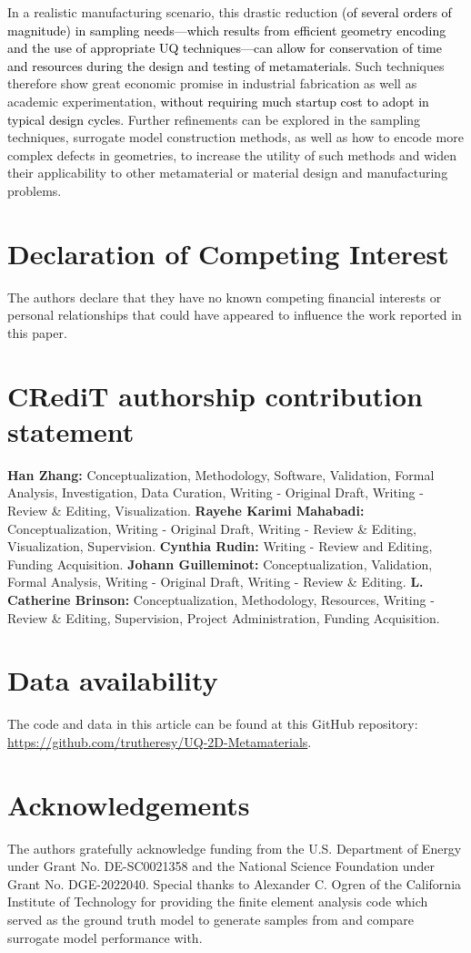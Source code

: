 \documentclass[preprint,review,12pt]{elsarticle}
\newcommand{\rev}[1]{\textcolor{black}{#1}}
\begin{document}
In a realistic manufacturing scenario, this drastic reduction \rev{(of several orders of magnitude) in sampling needs---which results from efficient geometry encoding and the use of appropriate UQ techniques---can allow for conservation of time and resources during the design and testing of metamaterials.} Such techniques therefore show great economic promise in industrial fabrication as well as academic experimentation, \rev{without requiring much startup cost to adopt in typical design cycles}. Further refinements can be explored in the sampling techniques, surrogate model construction methods, as well as how to encode more complex defects in geometries, to increase the utility of such methods and widen their applicability to other metamaterial or material design and manufacturing problems.

\section*{Declaration of Competing Interest}
The authors declare that they have no known competing financial interests or personal relationships that could have appeared to influence the work reported in this paper.

\section*{CRediT authorship contribution statement}
\textbf{Han Zhang:} Conceptualization, Methodology, Software, Validation, Formal Analysis, Investigation, Data Curation, Writing - Original Draft, Writing - Review \& Editing, Visualization. \textbf{Rayehe Karimi Mahabadi:} Conceptualization, Writing - Original Draft, Writing - Review \& Editing, Visualization, Supervision. \textbf{Cynthia Rudin:} Writing - Review and Editing, Funding Acquisition. \textbf{Johann Guilleminot:} Conceptualization, Validation, Formal Analysis, Writing - Original Draft, Writing - Review \& Editing. \textbf{L. Catherine Brinson:} Conceptualization, Methodology, Resources, Writing - Review \& Editing, Supervision, Project Administration, Funding Acquisition.

\section*{Data availability}
The code and data in this article
can be found at this GitHub repository:
\url{https://github.com/trutheresy/UQ-2D-Metamaterials}.

\section*{Acknowledgements}
The authors gratefully acknowledge funding from the U.S. Department of Energy under Grant No. DE-SC0021358 and the National Science Foundation under Grant No. DGE-2022040. Special thanks to Alexander C. Ogren of the California Institute of Technology for providing the finite element analysis code which served as the ground truth model to generate samples from and compare surrogate model performance with. 
\end{document}
